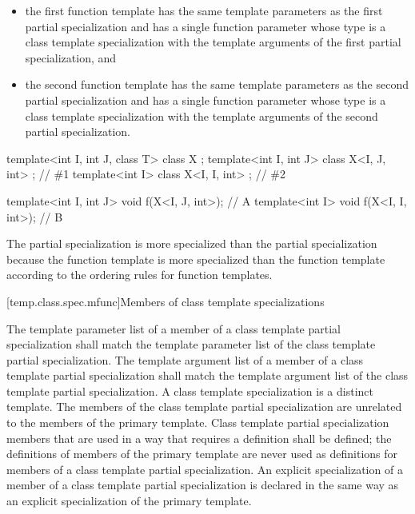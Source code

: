 \begin{itemize}
\item
the first function template has the same template parameters as
the first partial specialization and has a single function parameter
whose type is a class template specialization with the template arguments of
the first partial specialization, and
\item
the second function template has the same template parameters as
the second partial specialization and has a single function parameter
whose type is a class template specialization with the template arguments of
the second partial specialization.
\end{itemize}

\pnum
\enterexample
\begin{codeblock}
template<int I, int J, class T> class X { };
template<int I, int J>          class X<I, J, int> { }; // \#1
template<int I>                 class X<I, I, int> { }; // \#2

template<int I, int J> void f(X<I, J, int>);            // A
template<int I>        void f(X<I, I, int>);            // B
\end{codeblock}

The partial specialization
is more specialized than the partial specialization
because the function template
is more specialized than the function template
according to the ordering rules for function templates.
\exitexample

[temp.class.spec.mfunc]{Members of class template specializations}

\pnum
The template parameter list of a member of a class template partial
specialization shall match the template parameter list of the class template
partial specialization.
The template argument list of a member of a class template partial
specialization shall match the template argument list of the class template
partial specialization.
A class template specialization is a distinct template.
The members of the class template partial specialization are
unrelated to the members of the primary template.
Class template partial specialization members that are used in a way that
requires a definition shall be defined; the definitions of members of the
primary template are never used as definitions for members of a class
template partial specialization.
An explicit specialization of a member of a class template partial
specialization is declared in the same way as an explicit specialization of
the primary template.
\enterexample

